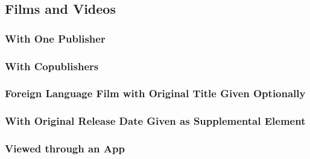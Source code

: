 \documentclass{ltxdockit}
\begin{document}
\subsection{Films and Videos} %
\label{sec:films_and_videos}
\subsubsection{With One Publisher} %
\label{sub:with_one_publisher}
\begin{refsection}
	\printbibliography[heading=none]
\end{refsection}
\subsubsection{With Copublishers} %
\label{sub:with_copublishers}
\begin{refsection}
	\printbibliography[heading=none]
\end{refsection}
\subsubsection{Foreign Language Film with Original Title Given Optionally} %
\label{sub:foreign_language_film_with_original_title_given_optionally}
\begin{refsection}
	\printbibliography[heading=none]
\end{refsection}
\subsubsection{With Original Release Date Given as Supplemental Element} %
\label{sub:with_original_release_date_given_as_supplemental_element}
\begin{refsection}
	\printbibliography[heading=none]
\end{refsection}
\subsubsection{Viewed through an App} %
\label{sub:film_viewed_through_an_app}
\begin{refsection}
	\printbibliography[heading=none]
\end{refsection}
\end{document}
